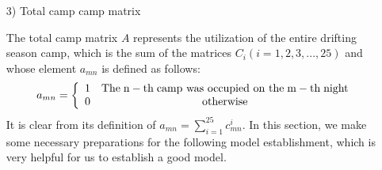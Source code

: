 \begin{enumerate}
	\item[3)]Total camp camp matrix
	\par The total camp matrix $A$ represents the utilization of the entire drifting season camp, which is the sum of the matrices ${C_i}(i = 1,2,3,...,25)$ and whose element ${a_{mn}}$ is defined as follows:
	\begin{equation}
		{a_{mn}} = \left\{ {\begin{array}{*{20}{c}}
			{\rm{1}}&{{\rm{The\; n-th\; camp\ was\ occupied\ on\ the\; m-th\; night}}}\\
			{\rm{0}}&{{\rm{otherwise}}}
			\end{array}} \right.\label{aa1}
	\end{equation}
	It is clear from its definition of ${a_{mn}} = \sum\limits_{i = 1}^{25} {c_{mn}^i} $.
	In this section, we make some necessary preparations for the following model establishment, which is very helpful for us to establish a good model.
\end{enumerate}

